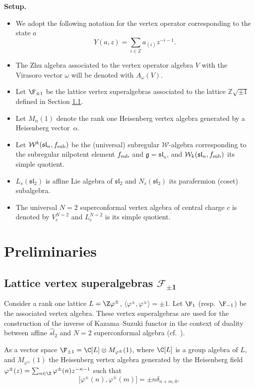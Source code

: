 {\bf Setup.}
\begin{itemize}\itemsep=0pt
	\item We adopt the following notation for the vertex operator corresponding to the state $a$
\[
Y (a, z) = \sum _{i \in \mathbb{Z}} a_{(i)}z^{-i-1}.
\]
\item The Zhu algebra associated to the vertex operator algebra $V$ with the Virasoro vector $\omega$ will be denoted with $A_{\omega}(V)$.
\item Let $\F_{\pm 1}$ be the lattice vertex {super}algebras associated to the lattice ${\mathbb Z}\sqrt{\pm 1}$ defined in Section \ref{F_{-1}}.
\item Let $M_{\alpha}(1)$ denote the rank one Heisenberg vertex algebra generated by a Heisenberg vector~$\alpha$.
\item Let $\mathcal{W}^k(\mathfrak{sl}_n, f_{\rm sub})$ be the (universal) subregular $\mathcal{W}$-algebra corresponding to the subregular nilpotent element $f_{\rm sub}$ and $\mathfrak g = \mathfrak{sl}_n$, and $\mathcal{W}_k(\mathfrak{sl}_n, f_{\rm sub})$ its simple quotient.
\item $L_s(\mathfrak{sl}_2)$ is affine Lie algebra of $\mathfrak{sl}_2$ and $N_s(\mathfrak{sl}_2)$ its parafermion (coset) subalgebra.
\item The universal $N=2$ superconformal vertex algebra of central charge $c$ is denoted by $V^{N=2}_c$ and $L^{N=2}_{c}$ is its simple quotient.
\end{itemize}

\section{Preliminaries}	

\subsection[Lattice vertex superalgebras F\_1]{ Lattice vertex superalgebras $\boldsymbol{\mathcal F_{\pm 1}}$} \label{F_{-1}}

Consider a rank one lattice $L= {\Z}\varphi^{\pm} $, $\big\langle \varphi^{\pm}, \varphi^{\pm} \big\rangle = \pm 1$. Let $\F_{1}$ (resp.\ $\F_{-1}$) be the associated vertex algebra. These vertex superalgebras are used for the construction of the inverse of Kazama--Suzuki functor in the context of duality between affine $\widehat{sl}_2$ and $N=2$ superconformal algebra (cf.\ \cite{A-IMRN,A-2001,FST}).

As a vector space $\F_{\pm 1} = {\C}[L] \otimes M_{\varphi^{\pm}} (1)$, where ${\C}[L]$ is a group algebra of $L$, and $M_{\varphi^{\pm}} (1)$ the Heisenberg vertex algebra generated by the Heisenberg field $\varphi^{\pm}(z) = \sum_{n \in {\Z} } \varphi^{\pm}(n) z^{-n-1}$ such that
\[
 \bigl[\varphi^{\pm}(n), \varphi^{\pm}(m)\bigr] = \pm n \delta_{n+m, 0}.
 \]

